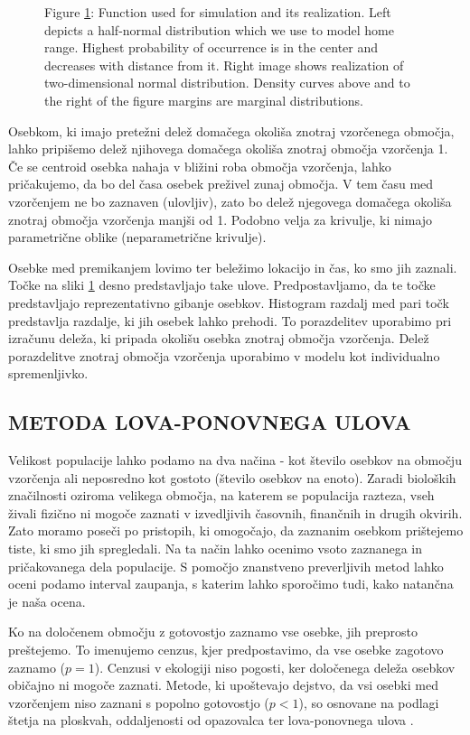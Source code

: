 \begin{figure}
{\medskip

Figure \ref{sli:slika2}: Function used for simulation and its realization. Left depicts a half-normal distribution which we use to model home range. Highest probability of occurrence is in the center and decreases with distance from it. Right image shows realization of two-dimensional normal distribution. Density curves above and to the right of the figure margins are marginal distributions.}
\label{sli:slika2}
\end{figure}

Osebkom, ki imajo pretežni delež domačega okoliša znotraj vzorčenega območja, lahko pripišemo delež njihovega domačega okoliša znotraj območja vzorčenja 1. Če se centroid osebka nahaja v bližini roba območja vzorčenja, lahko pričakujemo, da bo del časa osebek preživel zunaj območja. V tem času med vzorčenjem ne bo zaznaven (ulovljiv), zato bo delež njegovega domačega okoliša znotraj območja vzorčenja manjši od 1. Podobno velja za krivulje, ki nimajo parametrične oblike (neparametrične krivulje).

Osebke med premikanjem lovimo ter beležimo lokacijo in čas, ko smo jih zaznali. Točke na sliki \ref{sli:slika2} desno predstavljajo take ulove. Predpostavljamo, da te točke predstavljajo reprezentativno gibanje osebkov. Histogram razdalj med pari točk predstavlja razdalje, ki jih osebek lahko prehodi. To porazdelitev uporabimo pri izračunu deleža, ki pripada okolišu osebka znotraj območja vzorčenja. Delež porazdelitve znotraj območja vzorčenja uporabimo v modelu kot individualno spremenljivko.

\subsection{METODA LOVA-PONOVNEGA ULOVA}
Velikost populacije lahko podamo na dva načina - kot število osebkov na območju vzorčenja ali neposredno kot gostoto (število osebkov na enoto). Zaradi bioloških značilnosti oziroma velikega območja, na katerem se populacija razteza, vseh živali fizično ni mogoče zaznati v izvedljivih časovnih, finančnih in drugih okvirih. Zato moramo poseči po pristopih, ki omogočajo, da zaznanim osebkom prištejemo tiste, ki smo jih spregledali. Na ta način lahko ocenimo vsoto zaznanega in pričakovanega dela populacije. S pomočjo znanstveno preverljivih metod lahko oceni podamo interval zaupanja, s katerim lahko sporočimo tudi, kako natančna je naša ocena.

Ko na določenem območju z gotovostjo zaznamo vse osebke, jih preprosto preštejemo. To imenujemo cenzus, kjer predpostavimo, da vse osebke zagotovo zaznamo ($p=1$). Cenzusi v ekologiji niso pogosti, ker določenega deleža osebkov običajno ni mogoče zaznati. Metode, ki upoštevajo dejstvo, da vsi osebki med vzorčenjem niso zaznani s popolno gotovostjo ($p < 1$), so osnovane na podlagi štetja na ploskvah, oddaljenosti od opazovalca ter lova-ponovnega ulova \citep{williams_analysis_2002}.

